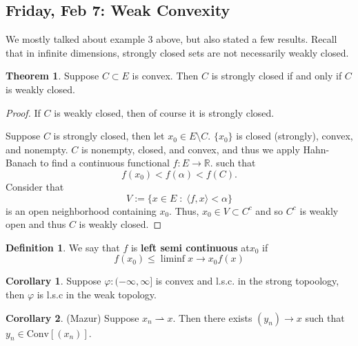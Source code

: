 \documentclass[10pt, oneside]{article}
\newcommand{\bbR}{\mathbb{R}}
\theoremstyle{definition}
\newtheorem{thm}{Theorem}
\newtheorem{defn}{Definition}
\newtheorem{cor}{Corollary}
\begin{document}
\subsection{Friday, Feb 7: Weak Convexity}
We mostly talked about example $3$ above, but also stated a few results. Recall that in infinite dimensions, strongly closed sets are not necessarily weakly closed. 
\begin{thm}
    Suppose $C\subset E$ is convex. Then $C$ is strongly closed if and only if $C$ is weakly closed.
\end{thm}
\begin{proof}
    If $C$ is weakly closed, then of course it is strongly closed. 

    Suppose $C$ is strongly closed, then let $x_0 \in E\setminus C.$ $\{x_0\}$ is closed (strongly), convex, and nonempty. $C$ is nonempty, closed, and convex, and thus we apply Hahn-Banach to find a continuous functional $f: E \to \bbR.$ such that 
    \[f(x_0) < f(\alpha) < f(C).\] Consider that 
    \[V:= \{x\in E \; : \; \langle f, x \rangle < \alpha\}\] is an open neighborhood containing $x_0.$ Thus, $x_0 \in V \subset C^c$ and so $C^c$ is weakly open and thus $C$ is weakly closed.
\end{proof}
\begin{defn}
    We say that $f$ is \textbf{left semi continuous} at$x_0$ if \[f(x_0) \leq \liminf{x\to x_0} f(x)\]
\end{defn}
\begin{cor}
    Suppose $\varphi: (-\infty, \infty]$ is convex and l.s.c. in the strong topoology, then $\varphi$ is l.s.c in the weak topology.
\end{cor}
\begin{cor}
    (Mazur) Suppose $x_n \rightharpoonup x.$ Then there exists $(y_n)\to x$ such that $y_n \in \text{Conv}[(x_n)].$
\end{cor}

\newpage
\end{document}
